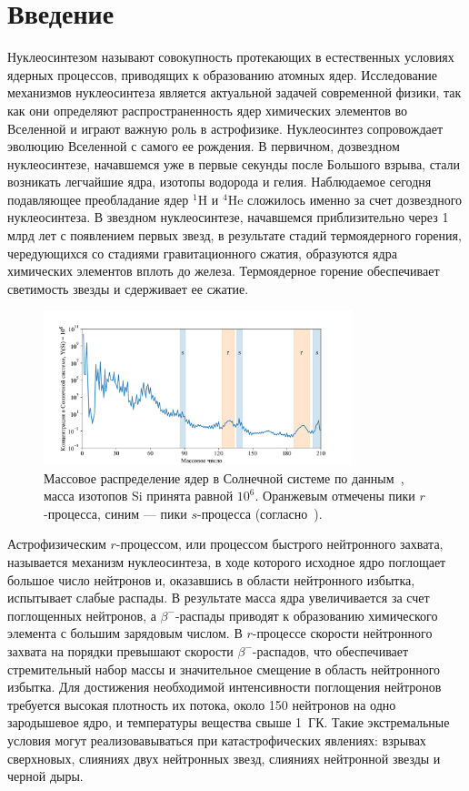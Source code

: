\section{Введение}
Нуклеосинтезом называют совокупность протекающих в естественных условиях ядерных процессов, приводящих к образованию атомных ядер. Исследование механизмов нуклеосинтеза является актуальной задачей современной физики, так как они определяют распространенность ядер химических элементов во Вселенной и играют важную роль в астрофизике. Нуклеосинтез сопровождает эволюцию Вселенной с самого ее рождения. В первичном, дозвездном нуклеосинтезе, начавшемся уже в первые секунды после Большого взрыва, стали возникать легчайшие ядра, изотопы водорода и гелия. Наблюдаемое сегодня подавляющее преобладание ядер ${}^1$H и ${}^4$He сложилось именно за счет дозвездного нуклеосинтеза. В звездном нуклеосинтезе, начавшемся приблизительно через 1 млрд лет с появлением первых звезд, в результате стадий термоядерного горения, чередующихся со стадиями гравитационного сжатия, образуются ядра химических элементов вплоть до железа. Термоядерное горение обеспечивает светимость звезды и сдерживает ее сжатие.

\begin{figure}[!b]
  \centering
  \includegraphics[width=0.8\textwidth]{pics/lodders.pdf}
  \caption{Массовое распределение ядер в Солнечной системе по данным~\cite{lodders2003}, масса изотопов Si принята равной $10^6$. Оранжевым отмечены пики $r$-процесса, синим --- пики $s$-процесса (согласно~\cite{cowan2021}).}
  \label{fig:lodders_vs_ame}
\end{figure}

Астрофизическим $r$-процессом, или процессом быстрого нейтронного захвата, называется механизм нуклеосинтеза, в ходе которого исходное ядро поглощает большое число нейтронов и, оказавшись в области нейтронного избытка, испытывает слабые распады. В результате масса ядра увеличивается за счет поглощенных нейтронов, а $\beta^-$-распады приводят к образованию химического элемента с большим зарядовым числом. В $r$-процессе скорости нейтронного захвата на порядки превышают скорости $\beta^-$-распадов, что обеспечивает стремительный набор массы и значительное смещение в область нейтронного избытка. Для достижения необходимой интенсивности поглощения нейтронов требуется высокая плотность их потока, около 150 нейтронов на одно зародышевое ядро, и температуры вещества свыше 1~ГК. Такие экстремальные условия могут реализовавываться при катастрофических явлениях: взрывах сверхновых, слияниях двух нейтронных звезд, слияниях нейтронной звезды и черной дыры. 

